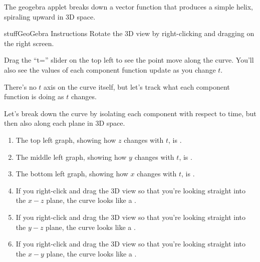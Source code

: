 \documentclass{ximera}
\begin{document}
\begin{problem}
The geogebra applet breaks down a vector function that produces a simple helix, spiraling upward in 3D space.

\begin{expandable}{stuff}{GeoGebra Instructions}
    Rotate the 3D view by right-clicking and dragging on the right screen. 
    
    Drag the ``t='' slider on the top left to see the point move along the curve. You'll also see the values of each component function update as you change $t$.
\end{expandable}

\begin{center}
\end{center}

There's no $t$ axis on the curve itself, but let's track what each component function is doing as $t$ changes.

Let's break down the curve by isolating each component with respect to time, but then also along each plane in 3D space.

\begin{enumerate}

\item The top left graph, showing how $z$ changes with $t$, is .

\item The middle left graph, showing how $y$ changes with $t$, is .

\item The bottom left graph, showing how $x$ changes with $t$, is .

\item If you right-click and drag the 3D view so that you're looking straight into the $x-z$ plane, the curve looks like a .

\item If you right-click and drag the 3D view so that you're looking straight into the $y-z$ plane, the curve looks like a .

\item If you right-click and drag the 3D view so that you're looking straight into the $x-y$ plane, the curve looks like a .

\end{enumerate}

\end{problem}
\end{document}
